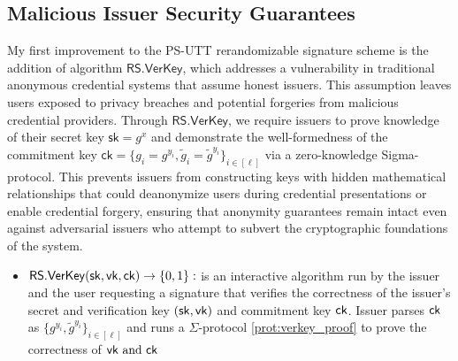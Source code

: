 \subsection{Malicious Issuer Security Guarantees}\label{subsec:malicious_issuer_security_guarantee}
My first improvement to the PS-UTT rerandomizable signature scheme is the addition of algorithm $\mathsf{RS.VerKey}$, which addresses a vulnerability in traditional anonymous credential systems that assume honest issuers. This assumption leaves users exposed to privacy breaches and potential forgeries from malicious credential providers. Through $\mathsf{RS.VerKey}$, we require issuers to prove knowledge of their secret key $\mathsf{sk} = g^x$ and demonstrate the well-formedness of the commitment key $\mathsf{ck} = \{g_i = g^{y_i}, \tilde{g}_i = \tilde{g}^{y_i}\}_{i \in [\ell]}$ via a zero-knowledge Sigma-protocol. This prevents issuers from constructing keys with hidden mathematical relationships that could deanonymize users during credential presentations or enable credential forgery, ensuring that anonymity guarantees remain intact even against adversarial issuers who attempt to subvert the cryptographic foundations of the system.

\begin{itemize}
        \item $\mathsf{RS.VerKey}(\mathsf{sk}, \mathsf{vk}, \mathsf{ck}) \to \{0,1\}:$ is an interactive algorithm run by the issuer and the user requesting a signature that verifies the correctness of the issuer's secret and verification key $(\mathsf{sk}, \mathsf{vk})$ and commitment key $\mathsf{ck}$. Issuer parses $\mathsf{ck}$ as $\{g^{y_i}, \tilde{g}^{y_i}\}_{i \in  [\ell]}$ and runs a $\Sigma$-protocol \ref{prot:verkey_proof} to prove the correctness of $\mathsf{vk}\text{ and } \mathsf{ck}$
\end{itemize}

